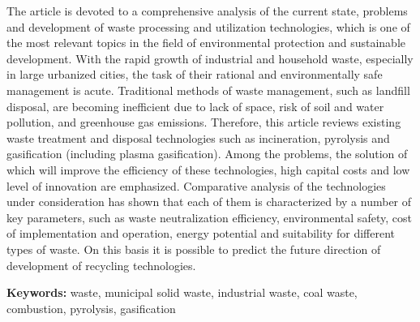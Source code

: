 The article is devoted to a comprehensive analysis of the current state,
problems and development of waste processing and utilization
technologies, which is one of the most relevant topics in the field of
environmental protection and sustainable development. With the rapid
growth of industrial and household waste, especially in large urbanized
cities, the task of their rational and environmentally safe management
is acute. Traditional methods of waste management, such as landfill
disposal, are becoming inefficient due to lack of space, risk of soil
and water pollution, and greenhouse gas emissions. Therefore, this
article reviews existing waste treatment and disposal technologies such
as incineration, pyrolysis and gasification (including plasma
gasification). Among the problems, the solution of which will improve
the efficiency of these technologies, high capital costs and low level
of innovation are emphasized. Comparative analysis of the technologies
under consideration has shown that each of them is characterized by a
number of key parameters, such as waste neutralization efficiency,
environmental safety, cost of implementation and operation, energy
potential and suitability for different types of waste. On this basis it
is possible to predict the future direction of development of recycling
technologies.

{\bfseries Keywords:} waste, municipal solid waste, industrial waste, coal
waste, combustion, pyrolysis, gasification

